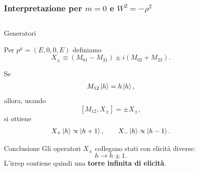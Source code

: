 \documentclass[11pt,t,aspectratio=169]{beamer}
\begin{document}
\begin{frame}[c]
    \frametitle{Interpretazione per $m=0$ e $W^2=-\rho^2$}

    \begin{columns}[T,onlytextwidth]

        \begin{column}{0.50\textwidth}

            \begin{block}{Generatori}

                Per $p^\mu=(E,0,0,E)$ definiamo
                \[
                    X_\pm \equiv (M_{01}-M_{31}) \pm i(M_{02}+M_{23}).
                \]

                Se
                \[
                    M_{12}\ket{h}=h\ket{h},
                \]
                allora, usando
                \[
                    [M_{12},X_\pm]=\pm X_\pm,
                \]
                si ottiene
                \[
                    X_+\ket{h}\propto \ket{h+1},
                    \qquad
                    X_-\ket{h}\propto \ket{h-1}.
                \]

            \end{block}

            \begin{alertblock}{Conclusione}
                Gli operatori $X_\pm$ collegano stati con elicità diverse:
                \[
                    h \longrightarrow h\pm 1.
                \]
                L'irrep contiene quindi una \textbf{torre infinita di elicità}.
            \end{alertblock}

        \end{column}

        \hfill

        \begin{column}{0.56\textwidth}
   \vspace{-0.95cm}
            \begin{center}
            \begin{tikzpicture}[
                scale=1.0,
                every node/.style={font=\normalsize},
                state/.style={
                    draw,
                    rounded corners,
                    minimum width=2.5cm,
                    minimum height=0.75cm
                }
            ]


\end{tikzpicture}
\end{center}
\end{column}
\end{columns}
\end{frame}
\end{document}
